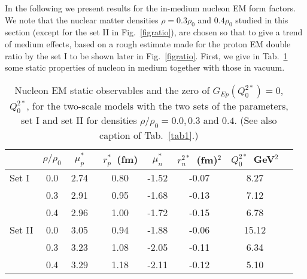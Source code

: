 \documentclass[preprint,aps,showpacs,floatfix]{revtex4}
\begin{document}
In the following we present results for the in-medium nucleon EM form factors.
We note that the nuclear matter densities $\rho=0.3\rho_0$ and $0.4\rho_0$ 
studied in this section (except for the set II in Fig.~\ref{figratio}),    
are chosen so that to give a trend of medium effects, 
based on a rough estimate made for the proton EM double ratio 
by the set I to be shown later in Fig.~\ref{figratio}.
First, we give in Tab.~\ref{tab_medium} some static properties 
of nucleon in medium together with those in vacuum.
\begin{table}[htbp]
\caption{Nucleon EM static observables and the zero of
$G_{Ep}(Q^{2 *}_0) = 0$, $Q^{2 *}_0$, for the two-scale models 
with the two sets of the parameters, set I and set II for 
densities $\rho/\rho_0 = 0.0, 0.3$ and $0.4$.  
(See also caption of Tab.~\ref{tab1}.)
\label{tab_medium}
}
\begin{center}
\begin{tabular}{|l|c|c|c|c|c|c|c|}
\hline 
\hline
 & $\rho/\rho_{0}$ &$\mu_p^*$ &~$r_p^*$~(fm) & $\mu_n^*$&
$r^{2 *}_n$~(fm)$^2$ & $Q_0^{2 *}$~GeV$^2$ \\
\hline
Set I & 0.0   & 2.74   &~0.80  & -1.52 & -0.07 & 8.27  \\
      & 0.3   & 2.91   &~0.95  & -1.68 & -0.13 & 7.12  \\
      & 0.4   & 2.96   &~1.00  & -1.72 & -0.15 & 6.78  \\
\hline
Set II & 0.0   & 3.05 &~0.94  & -1.88 & -0.06 & 15.12  \\
       & 0.3   & 3.23 &~1.08  & -2.05 & -0.11 & 6.34  \\
       & 0.4   & 3.29 &~1.18  & -2.11 & -0.12 & 5.10  \\
\hline
\hline 
\end{tabular}
\end{center}
\end{table}
\end{document}
